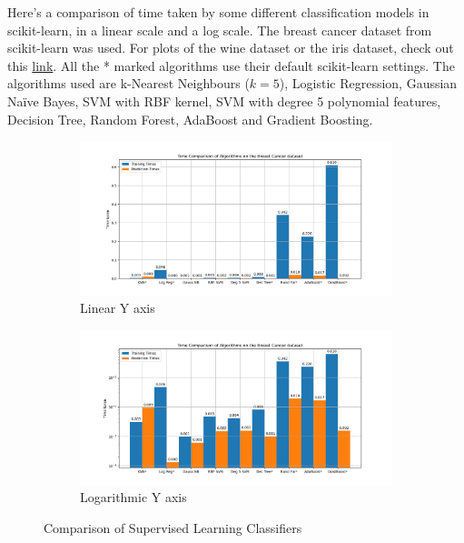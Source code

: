 \documentclass{article}
\begin{document}
Here's a comparison of time taken by some different classification models in scikit-learn, in a linear scale and a log scale. The breast cancer dataset from scikit-learn was used. For plots of the wine dataset or the iris dataset, check out this \href{https://github.com/sbalan7/ML-and-Stats/tree/master/Images/Sup_Learn_Classifiers}{link}. All the * marked algorithms use their default scikit-learn settings. The algorithms used are k-Nearest Neighbours ($k=5$), Logistic Regression, Gaussian Na{\"i}ve Bayes, SVM with RBF kernel, SVM with degree 5 polynomial features, Decision Tree, Random Forest, AdaBoost and Gradient Boosting.

\begin{figure}[H]
\centering
\begin{subfigure}{.5\textwidth}
  \centering
  \includegraphics[width=\linewidth]{Images/sup_learn_comp_lin.png}
  \caption{Linear Y axis}
\end{subfigure}%
\begin{subfigure}{.5\textwidth}
  \centering
  \includegraphics[width=\linewidth]{Images/sup_learn_comp_log.png}
  \caption{Logarithmic Y axis}
\end{subfigure}
\caption{Comparison of Supervised Learning Classifiers}
\end{figure}
\end{document}

